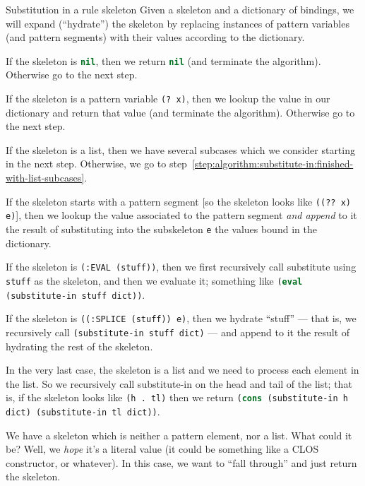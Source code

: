 \begin{algorithm}{Substitution in a rule skeleton}%
Given a skeleton and a dictionary of bindings, we will expand
(``hydrate'') the skeleton by replacing instances of pattern variables
(and pattern segments) with their values according to the dictionary.\setcounter{algorithmstep}{-1}

 If the skeleton is \lstinline[language=lisp]{nil},
then we return \lstinline[language=lisp]{nil} (and terminate the
algorithm). Otherwise go to the next step.

 If the skeleton is a pattern variable
\lstinline[language=lisp]{(? x)}, then we lookup the value in our
dictionary and return that value (and terminate the
algorithm). Otherwise go to the next step.

If the skeleton is a list, then we have several subcases which we
consider starting in the next step. Otherwise, we go to step~\ref{step:algorithm:substitute-in:finished-with-list-subcases}.

 If the skeleton starts with
a pattern segment [so the skeleton looks like
\lstinline[language=lisp]{((?? x) e)}], then we lookup the value
associated to the pattern segment \emph{and append} to it the result of
substituting into the subskeleton \lstinline[language=lisp]{e} the
values bound in the dictionary.

 If the skeleton is
\lstinline[language=lisp]{(:EVAL (stuff))}, then we first recursively
call substitute using \lstinline[language=lisp]{stuff} as the skeleton,
and then we evaluate it; something like
\lstinline[language=lisp]{(eval (substitute-in stuff dict))}.

 If the skeleton is
\lstinline[language=lisp]{((:SPLICE (stuff)) e)}, then we hydrate
``stuff'' --- that is, we recursively call
\lstinline[language=lisp]{(substitute-in stuff dict)} --- and append to
it the result of hydrating the rest of the skeleton.

 In the very last case, the
skeleton is a list and we need to process each element in the list. So
we recursively call substitute-in on the head and tail of the list; that
is, if the skeleton looks like \lstinline[language=lisp]{(h . tl)} then
we return
\lstinline[language=lisp]{(cons (substitute-in h dict) (substitute-in tl dict))}.

\label{step:algorithm:substitute-in:finished-with-list-subcases}
We have a skeleton which is neither a pattern element, nor a list. What
could it be? Well, we \emph{hope} it's a literal value (it could be
something like a CLOS constructor, or whatever). In this case, we want to ``fall
through'' and just return the skeleton.\quad\qedsymbol
\end{algorithm}


